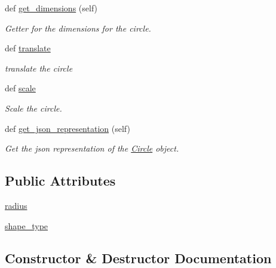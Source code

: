 \begin{DoxyCompactItemize}
def \mbox{\hyperlink{classbridges_1_1circle_1_1_circle_a8b6af5d39ec48245f0244a7499082822}{get\+\_\+dimensions}} (self)
\begin{DoxyCompactList}\small\item\em Getter for the dimensions for the circle. \end{DoxyCompactList}\item 
def \mbox{\hyperlink{classbridges_1_1circle_1_1_circle_a45281756c505403dcee3bd5d0d04681f}{translate}}
\begin{DoxyCompactList}\small\item\em translate the circle \end{DoxyCompactList}\item 
def \mbox{\hyperlink{classbridges_1_1circle_1_1_circle_a85f41fd8adbaca617b96b5d656d8d6ff}{scale}}
\begin{DoxyCompactList}\small\item\em Scale the circle. \end{DoxyCompactList}\item 
def \mbox{\hyperlink{classbridges_1_1circle_1_1_circle_a7a1be40bcd6028dab0a5bcab6e69c355}{get\+\_\+json\+\_\+representation}} (self)
\begin{DoxyCompactList}\small\item\em Get the json representation of the \mbox{\hyperlink{classbridges_1_1circle_1_1_circle}{Circle}} object. \end{DoxyCompactList}\end{DoxyCompactItemize}
\subsection*{Public Attributes}
\begin{DoxyCompactItemize}
\item 
\mbox{\hyperlink{classbridges_1_1circle_1_1_circle_ab52ae32c28ea4175b815a7b04491205b}{radius}}
\item 
\mbox{\hyperlink{classbridges_1_1circle_1_1_circle_a34d318970485d12445ce43225b81428e}{shape\+\_\+type}}
\end{DoxyCompactItemize}


\subsection{Constructor \& Destructor Documentation}
\mbox{\label{classbridges_1_1circle_1_1_circle_a04dfb68bb632534cf715e2ce927cc76a}} 
